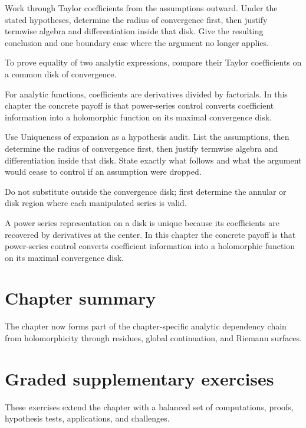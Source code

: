 \begin{exercise}\label{exr:iv03-07}
Work through Taylor coefficients from the assumptions outward. Under the stated hypotheses, determine the radius of convergence first, then justify termwise algebra and differentiation inside that disk. Give the resulting conclusion and one boundary case where the argument no longer applies.
\end{exercise}
\begin{hint}
To prove equality of two analytic expressions, compare their Taylor coefficients on a common disk of convergence.
\end{hint}
\begin{solution}
For analytic functions, coefficients are derivatives divided by factorials. In this chapter the concrete payoff is that power-series control converts coefficient information into a holomorphic function on its maximal convergence disk.
\end{solution}

\begin{exercise}\label{exr:iv03-08}
Use Uniqueness of expansion as a hypothesis audit. List the assumptions, then determine the radius of convergence first, then justify termwise algebra and differentiation inside that disk. State exactly what follows and what the argument would cease to control if an assumption were dropped.
\end{exercise}
\begin{hint}
Do not substitute outside the convergence disk; first determine the annular or disk region where each manipulated series is valid.
\end{hint}
\begin{solution}
A power series representation on a disk is unique because its coefficients are recovered by derivatives at the center. In this chapter the concrete payoff is that power-series control converts coefficient information into a holomorphic function on its maximal convergence disk.
\end{solution}

\section*{Chapter summary}
The chapter now forms part of the chapter-specific analytic dependency chain from holomorphicity through residues, global continuation, and Riemann surfaces.
\section{Graded supplementary exercises}
These exercises extend the chapter with a balanced set of computations, proofs, hypothesis tests, applications, and challenges.

